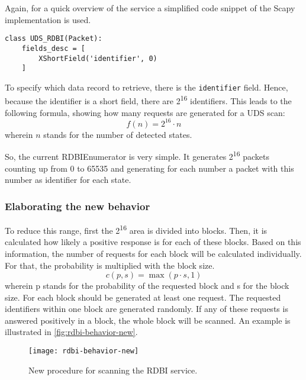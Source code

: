 Again, for a quick overview of the service a simplified code snippet of the Scapy implementation is used.

\begin{samepage}
\begin{verbatim}
class UDS_RDBI(Packet):
    fields_desc = [
        XShortField('identifier', 0)
    ]
\end{verbatim}
\end{samepage}

To specify which data record to retrieve, there is the \texttt{identifier} field. Hence, because the identifier is a short field, there are 2\textsuperscript{16} identifiers. This leads to the following formula, showing how many requests are generated for a UDS scan:
\[f(n)=2^{16} \cdot n\]
wherein $n$ stands for the number of detected states. 

So, the current RDBIEnumerator is very simple. It generates 2\textsuperscript{16} packets counting up from 0 to 65535 and generating for each number a packet with this number as identifier for each state.

\subsubsection{Elaborating the new behavior}

To reduce this range, first the 2\textsuperscript{16} area is divided into blocks. Then, it is calculated how likely a positive response is for each of these blocks. Based on this information, the number of requests for each block will be calculated individually.
For that, the probability is multiplied with the block size.
\[c(p, s)=\max(p \cdot s, 1)\]
wherein p stands for the probability of the requested block and s for the block size. For each block should be generated at least one request. The requested identifiers within one block are generated randomly. If any of these requests is answered positively in a block, the whole block will be scanned. An example is illustrated in \autoref{fig:rdbi-behavior-new}.

\begin{figure}[h]
    \centering
    \texttt{[image: rdbi-behavior-new]}
    \caption{New procedure for scanning the RDBI service.}
    \label{fig:rdbi-behavior-new}
\end{figure}


